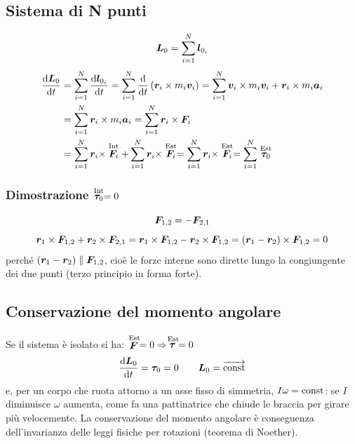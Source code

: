 \subsection{Sistema di N punti}
\[\boldsymbol{L}_0=\sum_{i=1}^N \boldsymbol{l}_{0_i}\]
\begin{align*}\frac{\mathrm{d} \boldsymbol{L}_0}{\mathrm{d} t} & =\sum_{i=1}^{N}\frac{\mathrm{d} \boldsymbol{l}_{0_i}}{\mathrm{d}
                t}=\sum_{i=1}^{N}\frac{\mathrm{d}}{\mathrm{d} t}\left(\boldsymbol{r}_i \times m_i\boldsymbol{v}_i\right)=\sum_{i=1}^{N}\boldsymbol{v}_i\times m_i \boldsymbol{v}_i+\boldsymbol{r}_i\times m_i\boldsymbol{a}_i                                                  \\
                                        & =\sum_{i=1}^{N}\boldsymbol{r}_i\times m_i\boldsymbol{a}_i=\sum_{i=1}^{N}\boldsymbol{r}_i\times\boldsymbol{F}_i                                \\
                                        & =\sum_{i=1}^{N}\boldsymbol{r}_i\times\stackrel{\text{Int}}{\boldsymbol{F}_i}+\sum_{i=1}^{N}\boldsymbol{r}_i\times\stackrel{\text{Est}}{\boldsymbol{F}_i}=\sum_{i=1}^{N}\boldsymbol{r}_i\times \stackrel{\text{Est}}{\boldsymbol{F}_i}=\sum_{i=1}^{N}\stackrel{\text{Est}}{\boldsymbol{\tau}_0}\end{align*}
\subsubsection{Dimostrazione $\stackrel{\text{Int}}{\boldsymbol{\tau}_0}=0$}
\[\boldsymbol{F}_{1,2}=-\boldsymbol{F}_{2,1}\]
\[\boldsymbol{r}_1\times \boldsymbol{F}_{1,2}+\boldsymbol{r}_2\times\boldsymbol{F}_{2,1}=\boldsymbol{r}_1\times \boldsymbol{F}_{1,2}-\boldsymbol{r}_2\times\boldsymbol{F}_{1,2}=\left(\boldsymbol{r}_1-\boldsymbol{r}_2\right)\times\boldsymbol{F}_{1,2}=0\]
perché $\left(\boldsymbol{r}_1-\boldsymbol{r}_2\right)\parallel \boldsymbol{F}_{1,2}$, cioè le forze interne sono dirette lungo la congiungente dei due punti (terzo principio in forma forte).
\subsection{Conservazione del momento angolare}
Se il sistema è isolato si ha: $\stackrel{\text{Est}}{\boldsymbol{F}}=0\Rightarrow \stackrel{\text{Est}}{\boldsymbol{\tau}}=0$
\[\frac{\mathrm{d} \boldsymbol{L}_0}{\mathrm{d} t}=\boldsymbol{\tau}_0=0\qquad \boldsymbol{L}_0=\overrightarrow{\text{const}}\]
e, per un corpo che ruota attorno a un asse fisso di simmetria,
$I\omega={\text{const}}$: se $I$ diminuisce $\omega$ aumenta, come fa una pattinatrice che chiude le braccia per girare più velocemente. La conservazione del momento angolare è conseguenza dell'invarianza delle leggi fisiche per
rotazioni (teorema di Noether).
